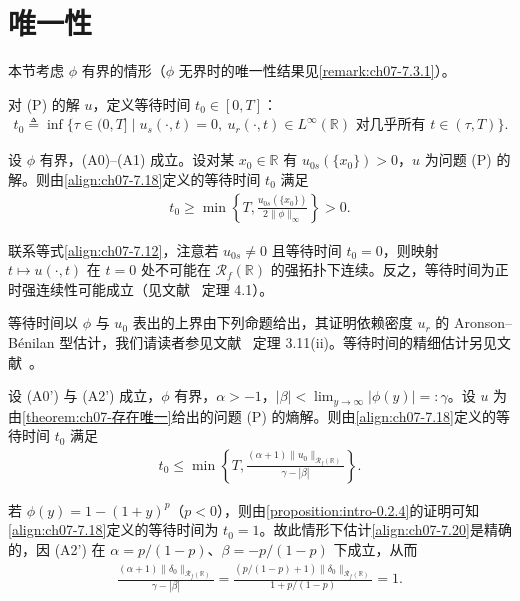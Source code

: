\documentclass[../../main.tex]{subfiles}%
\begin{document}
\section{唯一性}\label{section:ch07-唯一性}

本节考虑 $\phi$ 有界的情形（$\phi$ 无界时的唯一性结果见\cref{remark:ch07-7.3.1}）。

对 (P) 的解 $u$，定义等待时间 $t_0\in[0,T]$：
\begin{align}
t_0\triangleq \inf\{\tau\in(0,T]\mid u_s(\cdot,t)=0,\ u_r(\cdot,t)\in L^\infty(\mathbb{R})
\text{ 对几乎所有 }t\in(\tau,T)\}. \label{align:ch07-7.18}
\end{align}

\begin{proposition}\label{proposition:ch07-7.2.1}
设 $\phi$ 有界，(A0)--(A1) 成立。设对某 $x_0\in\mathbb{R}$ 有 $u_{0s}(\{x_0\})>0$，$u$ 为问题 (P) 的解。则由\eqref{align:ch07-7.18}定义的等待时间 $t_0$ 满足
\begin{align}
t_0\geqslant\min\left\{T,\frac{u_{0s}(\{x_0\})}{2\|\phi\|_\infty}\right\}>0. \label{align:ch07-7.19}
\end{align}
\end{proposition}

\begin{remark}\label{remark:ch07-7.2.1}
联系等式\eqref{align:ch07-7.12}，注意若 $u_{0s}\neq0$ 且等待时间 $t_0=0$，则映射 $t\mapsto u(\cdot,t)$ 在 $t=0$ 处不可能在 $\mathscr{R}_f(\mathbb{R})$ 的强拓扑下连续。反之，等待时间为正时强连续性可能成立（见文献~\cite{ref18} 定理 4.1）。
\end{remark}

等待时间以 $\phi$ 与 $u_0$ 表出的上界由下列命题给出，其证明依赖密度 $u_r$ 的 Aronson--Bénilan 型估计，我们请读者参见文献~\cite{ref18} 定理 3.11(ii)。等待时间的精细估计另见文献~\cite{ref20}。

\begin{proposition}\label{proposition:ch07-7.2.2}
设 (A0') 与 (A2') 成立，$\phi$ 有界，$\alpha>-1$，$|\beta|<\lim_{y\to\infty}|\phi(y)|=:\gamma$。设 $u$ 为由\cref{theorem:ch07-存在唯一}给出的问题 (P) 的熵解。则由\eqref{align:ch07-7.18}定义的等待时间 $t_0$ 满足
\begin{align}
t_0\leqslant\min\left\{T,\frac{(\alpha+1)\|u_0\|_{\mathscr{R}_f(\mathbb{R})}}{\gamma-|\beta|}\right\}. \label{align:ch07-7.20}
\end{align}
\end{proposition}

\begin{remark}\label{remark:ch07-7.2.2}
若 $\phi(y)=1-(1+y)^p$（$p<0$），则由\cref{proposition:intro-0.2.4}的证明可知\eqref{align:ch07-7.18}定义的等待时间为 $t_0=1$。故此情形下估计\eqref{align:ch07-7.20}是精确的，因 (A2') 在 $\alpha=p/(1-p)$、$\beta=-p/(1-p)$ 下成立，从而
\begin{align*}
\frac{(\alpha+1)\|\delta_0\|_{\mathscr{R}_f(\mathbb{R})}}{\gamma-|\beta|}
=\frac{(p/(1-p)+1)\|\delta_0\|_{\mathscr{R}_f(\mathbb{R})}}{1+p/(1-p)}=1.
\end{align*}
\end{remark}
\end{document}
